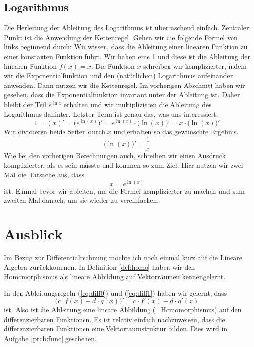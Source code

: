 \subsection{Logarithmus}
Die Herleitung der Ableitung des Logarithmus ist überraschend einfach. Zentraler Punkt ist die Anwendung der Kettenregel.  Gehen wir die folgende Formel von links beginnend durch: Wir wissen, dass die Ableitung einer linearen Funktion zu einer konstanten Funktion führt. Wir haben eine 1 und diese ist die Ableitung der linearen Funktion $f(x) = x$. Die Funktion $x$ schreiben wir komplizierter, indem wir die Exponentialfunktion und den (natürlichen) Logarithmus aufeinander anwenden. Dann nutzen wir die Kettenregel. Im vorherigen Abschnitt haben wir gesehen, dass die Exponentialfunktion invariant unter der Ableitung ist. Daher bleibt der Teil $e^{\ln x}$ erhalten und wir multiplizieren die Ableitung des Logarithmus dahinter. Letzter Term ist genau das, was uns interessiert. 
\begin{equation}
1 = (x)' = \big(e^{\ln(x)}\big)' = e^{\ln(x)}\cdot \big( \ln(x) \big)' = x \cdot \big( \ln(x) \big)'
\end{equation}
Wir dividieren beide Seiten durch $x$ und erhalten so das gewünschte Ergebnis.
\begin{equation}
\big( \ln(x) \big)' = \frac{1}{x}
\end{equation}
Wie bei den vorherigen Berechnungen auch, schreiben wir einen Ausdruck komplizierter, als es sein müsste und kommen so zum Ziel. Hier nutzen wir zwei Mal die Tatsache aus, dass
\begin{equation*}
x = e^{\ln(x)}
\end{equation*}
ist. Einmal bevor wir ableiten, um die Formel komplizierter zu machen und zum zweiten Mal danach, um sie wieder zu vereinfachen.

\section{Ausblick}

Im Bezug zur Differentialrechnung möchte ich noch einmal kurz auf die Lineare Algebra zurückkommen. In Definition \ref{def:homo} haben wir den Homomorphismus als lineare Abbildung auf Vektorräumen kennengelernt. 

In den Ableitungsregeln (\ref{eq:diff0}) und (\ref{eq:diff1}) haben wir gelernt, dass 
\begin{equation}
\big(c\cdot f(x) + d\cdot g(x)\big)' = c\cdot f'(x) + d\cdot g'(x)
\end{equation}
ist. Also ist die Ableitung eine lineare Abbildung (=Homomorphismus) auf den differenzierbaren Funktionen. Es ist relativ einfach nachzuweisen, dass die differenzierbaren Funktionen eine Vektorraumstruktur bilden. Dies wird in Aufgabe \ref{prob:func} geschehen.

